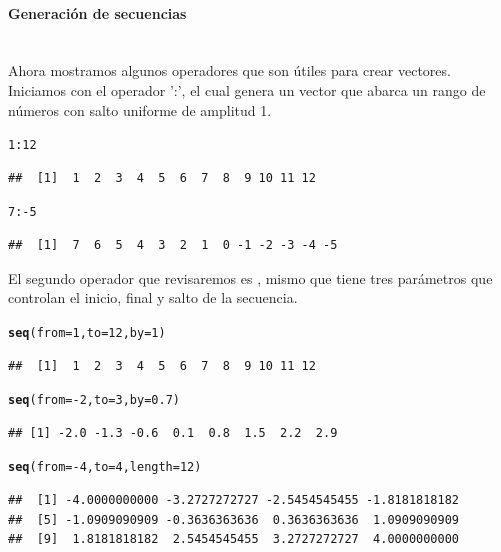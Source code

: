 \documentclass[11pt,a4paper,oneside]{book}\usepackage[]{graphicx}\usepackage[]{color}
\makeatletter
\newcommand{\hlnum}[1]{\textcolor[rgb]{0.686,0.059,0.569}{#1}}%
\newcommand{\hlopt}[1]{\textcolor[rgb]{0,0,0}{#1}}%
\newcommand{\hlstd}[1]{\textcolor[rgb]{0.345,0.345,0.345}{#1}}%
\newcommand{\hlkwc}[1]{\textcolor[rgb]{0.333,0.667,0.333}{#1}}%
\newcommand{\hlkwd}[1]{\textcolor[rgb]{0.737,0.353,0.396}{\textbf{#1}}}%
\newenvironment{kframe}{%
 \def\at@end@of@kframe{}%
 \ifinner\ifhmode%
  \def\at@end@of@kframe{\end{minipage}}%
  \begin{minipage}{\columnwidth}%
 \fi\fi%
 \def\FrameCommand##1{\hskip\@totalleftmargin \hskip-\fboxsep
 \colorbox{shadecolor}{##1}\hskip-\fboxsep
     \hskip-\linewidth \hskip-\@totalleftmargin \hskip\columnwidth}%
 \MakeFramed {\advance\hsize-\width
   \@totalleftmargin\z@ \linewidth\hsize
   \@setminipage}}%
 {\par\unskip\endMakeFramed%
 \at@end@of@kframe}
\newenvironment{knitrout}{}{} %
\newcommand{\code}[1]{\fcolorbox{white}{gray!15}{#1}}
\makeatother
\begin{document}
\begin{itemize}
\paragraph{Generación de secuencias}
~\\

Ahora mostramos algunos operadores que son útiles para crear vectores. Iniciamos con el operador ':', el cual genera un vector que abarca un rango de números con salto uniforme de amplitud 1.
\begin{knitrout}
\color{fgcolor}\begin{kframe}
\begin{alltt}
\hlnum{1}\hlopt{:}\hlnum{12}
\end{alltt}
\begin{verbatim}
##  [1]  1  2  3  4  5  6  7  8  9 10 11 12
\end{verbatim}
\begin{alltt}
\hlnum{7}\hlopt{:-}\hlnum{5}
\end{alltt}
\begin{verbatim}
##  [1]  7  6  5  4  3  2  1  0 -1 -2 -3 -4 -5
\end{verbatim}
\end{kframe}
\end{knitrout}

El segundo operador que revisaremos es \code{\texttt{seq( )}}, mismo que tiene tres parámetros que controlan el inicio, final y salto de la secuencia.
\begin{knitrout}
\color{fgcolor}\begin{kframe}
\begin{alltt}
\hlkwd{seq}\hlstd{(}\hlkwc{from} \hlstd{=} \hlnum{1}\hlstd{,} \hlkwc{to} \hlstd{=} \hlnum{12}\hlstd{,} \hlkwc{by} \hlstd{=} \hlnum{1}\hlstd{)}
\end{alltt}
\begin{verbatim}
##  [1]  1  2  3  4  5  6  7  8  9 10 11 12
\end{verbatim}
\begin{alltt}
\hlkwd{seq}\hlstd{(}\hlkwc{from} \hlstd{=} \hlopt{-}\hlnum{2}\hlstd{,} \hlkwc{to} \hlstd{=} \hlnum{3}\hlstd{,} \hlkwc{by} \hlstd{=} \hlnum{0.7}\hlstd{)}
\end{alltt}
\begin{verbatim}
## [1] -2.0 -1.3 -0.6  0.1  0.8  1.5  2.2  2.9
\end{verbatim}
\begin{alltt}
\hlkwd{seq}\hlstd{(}\hlkwc{from} \hlstd{=} \hlopt{-}\hlnum{4}\hlstd{,} \hlkwc{to} \hlstd{=} \hlnum{4}\hlstd{,} \hlkwc{length} \hlstd{=} \hlnum{12}\hlstd{)}
\end{alltt}
\begin{verbatim}
##  [1] -4.0000000000 -3.2727272727 -2.5454545455 -1.8181818182
##  [5] -1.0909090909 -0.3636363636  0.3636363636  1.0909090909
##  [9]  1.8181818182  2.5454545455  3.2727272727  4.0000000000
\end{verbatim}
\end{kframe}
\end{knitrout}


\end{itemize}
\end{document}
